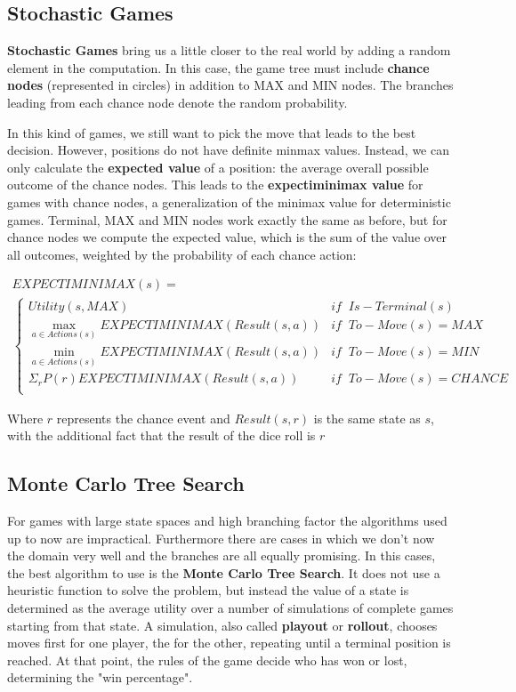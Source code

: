 \documentclass{article}
\begin{document}
\subsection{Stochastic Games}
\textbf{Stochastic Games} bring us a little closer to the real world by adding a random element in the computation. In this case, the game tree must include \textbf{chance nodes} (represented in circles) in addition to MAX and MIN nodes. The branches leading from each chance node denote the random probability. 

In this kind of games, we still want to pick the move that leads to the best decision. However, positions do not have definite minmax values. Instead, we can only calculate the \textbf{expected value} of a position: the average overall possible outcome of the chance nodes. This leads to the \textbf{expectiminimax value} for games with chance nodes, a generalization of the minimax value for deterministic games. Terminal, MAX and MIN nodes work exactly the same as before, but for chance nodes we compute the expected value, which is the sum of the value over all outcomes, weighted by the probability of each chance action:

\begin{multline}
    EXPECTIMINIMAX(s) = \\
    \begin{cases}
        Utility(s, MAX) & if \;\; Is-Terminal(s) \\
        \max_{a\in Actions(s)} EXPECTIMINIMAX(Result(s, a)) & if \;\; To-Move(s) = MAX \\
        \min_{a \in Actions(s)} EXPECTIMINIMAX(Result(s, a)) & if \;\; To-Move(s) = MIN \\
        \Sigma_{r}P(r) EXPECTIMINIMAX(Result(s, a)) & if\;\; To-Move(s) = CHANCE\\
    \end{cases}
\end{multline}

Where $r$ represents the chance event and $Result(s, r)$ is the same state as $s$, with the additional fact that the result of the dice roll is $r$

\subsection{Monte Carlo Tree Search}
For games with large state spaces and high branching factor the algorithms used up to now are impractical. Furthermore there are cases in which we don't now the domain very well and the branches are all equally promising. In this cases, the best algorithm to use is the \textbf{Monte Carlo Tree Search}. It does not use a heuristic function to solve the problem, but instead the value of a state is determined as the average utility over a number of simulations of complete games starting from that state. A simulation, also called \textbf{playout} or \textbf{rollout}, chooses moves first for one player, the for the other, repeating until a terminal position is reached. At that point, the rules of the game decide who has won or lost, determining the "win percentage".
\end{document}
